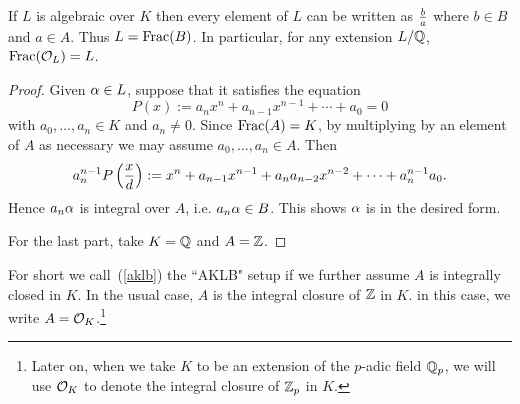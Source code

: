 \begin{pr}
If $L$ is algebraic over $K$ then every element of $L$ can be written as $\frac{b}{a}$ where $b\in B$ and $a\in A$. Thus  $L=\operatorname{Frac}(B)$.
In particular, for any extension $L/\mathbb{Q}$, $\operatorname{Frac}(\mathcal{O}_L)=L$.
\end{pr}
\begin{proof}
Given $\alpha\in L$, suppose that it satisfies the equation
\[
P(x):=a_nx^n+a_{n-1}x^{n-1}+\cdots +a_0=0
\]
with $a_0,\ldots, a_n\in K$ and $a_n\ne 0$. Since $\operatorname{Frac}(A)=K$, by multiplying by an element of $A$ as necessary we may assume $a_0,\ldots, a_n\in A$. Then
\[
a_n^{n-1}P\left( {\frac{x}{d}} \right):=x^n+a_{n-1}x^{n-1}+a_na_{n-2}x^{n-2}+\cdots +a_n^{n-1}a_0.
\]
Hence $a_n\alpha$ is integral over $A$, i.e. $a_n\alpha \in B$. This shows $\alpha$ is in the desired form.

For the last part, take $K=\mathbb{Q}$ and $A=\mathbb{Z}$.
\end{proof}
For short we call~(\ref{aklb}) the ``AKLB" setup if we further assume $A$ is integrally closed in $K$. In the usual case, $A$ is the integral closure of $\mathbb{Z}$ in $K$. in this case, we write $A=\mathcal{O}_K$.\footnote{Later on, when we take $K$ to be an extension of the $p$-adic field $\mathbb{Q}_p$, we will use $\mathcal{O}_K$ to denote the integral closure of $\mathbb{Z}_p$ in $K$.}

